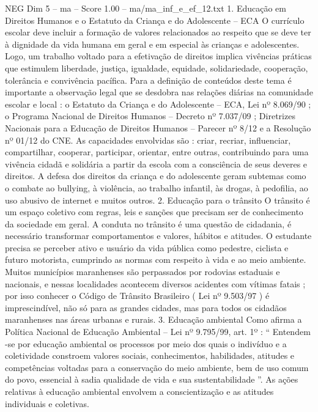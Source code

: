 \begin{textsample}{NEG Dim 5 – ma – Score 1.00 – ma/ma\_inf\_e\_ef\_12.txt}  \label{ex:f5_neg_120}
1.
Educação em Direitos Humanos e o Estatuto da Criança e do Adolescente – ECA O currículo escolar deve incluir a formação de valores relacionados ao respeito que se deve ter à dignidade da vida humana em geral e em especial às crianças e adolescentes.
Logo, um trabalho voltado para a efetivação de direitos implica vivências práticas que estimulem liberdade, justiça, igualdade, equidade, solidariedade, cooperação, tolerância e convivência pacífica.
Para a definição de conteúdos deste tema é importante a observação legal que se desdobra nas relações diárias na comunidade escolar e local : o Estatuto da Criança e do Adolescente – ECA, Lei nº 8.069/90 ; o Programa Nacional de Direitos Humanos – Decreto nº 7.037/09 ; Diretrizes Nacionais para a Educação de Direitos Humanos – Parecer nº 8/12 e a Resolução nº 01/12 do CNE.
As capacidades envolvidas são : criar, recriar, influenciar, compartilhar, cooperar, participar, orientar, entre outras, contribuindo para uma vivência cidadã e solidária a partir da escola com a consciência de seus deveres e direitos.
A defesa dos direitos da criança e do adolescente geram subtemas como o combate ao bullying, à violência, ao trabalho infantil, às drogas, à pedofilia, ao uso abusivo de internet e muitos outros. 2.
Educação para o trânsito O trânsito é um espaço coletivo com regras, leis e sanções que precisam ser de conhecimento da sociedade em geral.
A conduta no trânsito é uma questão de cidadania, é necessário transformar comportamentos e valores, hábitos e atitudes.
O estudante precisa se perceber ativo e usuário da vida pública como pedestre, ciclista e futuro motorista, cumprindo as normas com respeito à vida e ao meio ambiente.
Muitos municípios maranhenses são perpassados por rodovias estaduais e nacionais, e nessas localidades acontecem diversos acidentes com vítimas fatais ; por isso conhecer o Código de Trânsito Brasileiro ( Lei nº 9.503/97 ) é imprescindível, não só para as grandes cidades, mas para todos os cidadãos maranhenses nas áreas urbanas e rurais. 3.
Educação ambiental Como afirma a Política Nacional de Educação Ambiental – Lei nº 9.795/99, art. 1º : “ Entendem -se por educação ambiental os processos por meio dos quais o indivíduo e a coletividade constroem valores sociais, conhecimentos, habilidades, atitudes e competências voltadas para a conservação do meio ambiente, bem de uso comum do povo, essencial à sadia qualidade de vida e sua sustentabilidade ”.
As ações relativas à educação ambiental envolvem a conscientização e as atitudes individuais e coletivas.

\end{textsample}
